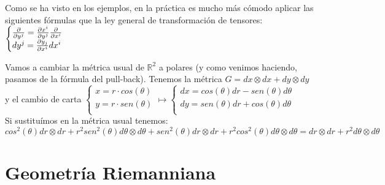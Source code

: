 \documentclass[palatino, bibnumbers]{apuntes}
\begin{document}
Como se ha visto en los ejemplos, en la práctica es mucho más cómodo aplicar las siguientes fórmulas que la ley general de transformación de tensores:
$\begin{cases}
\pdv{y^j}=\pdv{x^i}{y^j}\pdv{x^i}\\
dy^j=\pdv{y_j}{x^i}dx^i\\
\end{cases}$
\newpage
\begin{example}Vamos a cambiar la métrica usual de $ℝ^2$ a polares (y como venimos haciendo, pasamos de la fórmula del pull-back). Tenemos la métrica $G=dx\otimes dx+dy\otimes dy$ y el cambio de carta $\begin{cases}
	x=r\cdot cos (\theta)\\
	y=r\cdot sen(\theta)\\
	\end{cases}\mapsto
	\begin{cases}
	dx=cos(\theta)dr-sen(\theta)d\theta\\
	dy=sen(\theta)dr+cos(\theta)d\theta\\
	\end{cases}$\\
	Si sustituímos en la métrica usual tenemos: $$cos^2(\theta)dr\otimes dr+r^2sen^2(\theta)d\theta\otimes d\theta+sen^2(\theta)dr\otimes dr+r^2cos^2(\theta)d\theta\otimes d\theta=dr\otimes dr+r^2d\theta\otimes d\theta$$
\end{example}
\chapter{Geometría Riemanniana}
\end{document}
